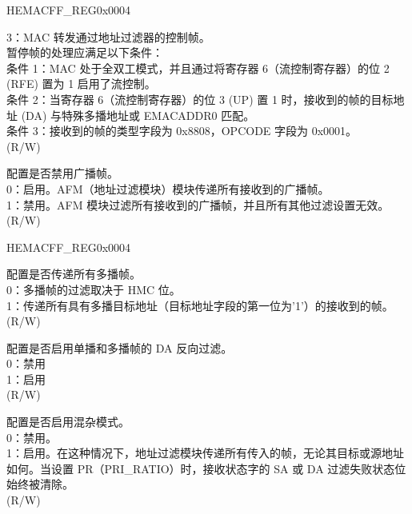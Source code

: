 \begin{register}{H}{EMACFF\_REG}{0x0004}
\begin{regdesc}
\begin{reglist}
3：MAC 转发通过地址过滤器的控制帧。\\
暂停帧的处理应满足以下条件：\\
条件 1：MAC 处于全双工模式，并且通过将寄存器 6（流控制寄存器）的位 2 (RFE) 置为 1 启用了流控制。\\
条件 2：当寄存器 6（流控制寄存器）的位 3 (UP) 置 1 时，接收到的帧的目标地址 (DA) 与特殊多播地址或 EMACADDR0 匹配。\\
条件 3：接收到的帧的类型字段为 0x8808，OPCODE 字段为 0x0001。\\
(R/W)
\item [DBF] 配置是否禁用广播帧。\\
0：启用。AFM（地址过滤模块）模块传递所有接收到的广播帧。\\
1：禁用。AFM 模块过滤所有接收到的广播帧，并且所有其他过滤设置无效。\\ (R/W)

\item[见下页...]
\end{reglist}\end{regdesc}
\end{register}
\addtocounter{Regfloat}{-1}
\begin{register}{H}{EMACFF\_REG}{0x0004}
\begin{regdesc}\begin{reglist}
\item[接上页...]

\item [PAM] 配置是否传递所有多播帧。\\
0：多播帧的过滤取决于 HMC 位。\\
1：传递所有具有多播目标地址（目标地址字段的第一位为'1'）的接收到的帧。\\
(R/W)
\item [DAIF] 配置是否启用单播和多播帧的 DA 反向过滤。\\
0：禁用\\
1：启用\\
(R/W)
\item [PMODE] 配置是否启用混杂模式。\\
0：禁用。\\
1：启用。在这种情况下，地址过滤模块传递所有传入的帧，无论其目标或源地址如何。当设置 PR（PRI\_RATIO）时，接收状态字的 SA 或 DA 过滤失败状态位始终被清除。\\(R/W)
\end{reglist}\end{regdesc}
\end{register}



